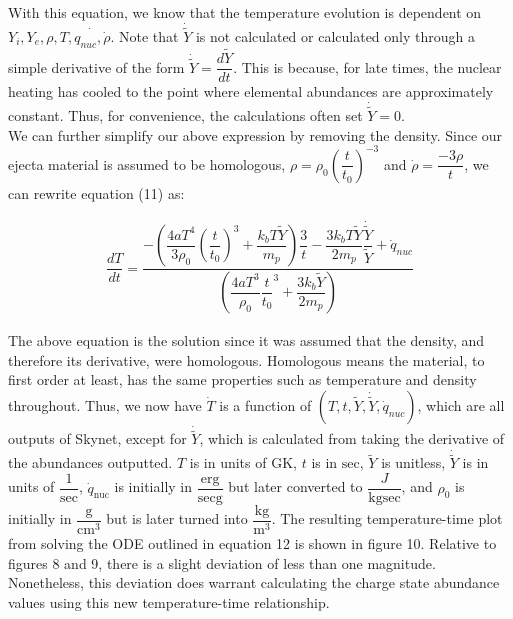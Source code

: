 \documentclass[11pt,a4paper]{article}
\begin{document}
With this equation, we know that the temperature evolution is dependent on $Y_i, Y_e, \rho, T, \dot{q_{nuc}, \dot{\rho}}$. Note that $\dot{\tilde{Y}}$ is not calculated or calculated only through a simple derivative of the form $\dot{\tilde{Y}} = \dfrac{d \tilde{Y}} {dt} $. This is because, for late times, the nuclear heating has cooled to the point where elemental abundances are approximately constant. Thus, for convenience, the calculations often set $\dot{\tilde{Y}} = 0$. \\

We can further simplify our above expression by removing the density. Since our ejecta material is assumed to be homologous,  $\rho = \rho_0 \left(\dfrac{t}{t_0}\right)^{-3}$ and $\dot{\rho} = \dfrac{-3 \rho}{t}$, we can rewrite equation (11) as:

\begin{align}
	\dfrac{dT}{dt} =  \dfrac{ -\left( \dfrac{4aT^4}{3 \rho_0} \left (\dfrac{t}{t_0} \right)^3 + \dfrac{k_b T \tilde{Y}}{m_p} \right) \dfrac{3}{t} - \dfrac{3 k_b T \tilde{Y}}{2 m_p} \dfrac{\dot{\tilde{Y}}}{\tilde{Y}} + \dot{q}_{nuc} } {  \left( \dfrac{4 a T^3}{\rho_0} \dfrac{t}{t_0}^3 + \dfrac{3 k_b \tilde{Y}}{2 m_p}\right) }
\end{align}

The above equation is the solution since it was assumed that the density, and therefore its derivative, were homologous. Homologous means the material, to first order at least, has the same properties such as temperature and density throughout.  Thus, we now have $\dot{T}$ is a function of $(T,t,\tilde{Y}, \dot{\tilde{Y}},\dot{q}_{nuc})$, which are all outputs of Skynet, except for $\dot{\tilde{Y}}$, which is calculated from taking the derivative of the abundances outputted. $T$ is in units of $\mathrm{GK}$, $t$ is in $\mathrm{sec}$, $\tilde{Y}$ is unitless,                $\dot{\tilde{Y}}$ is in units of $\dfrac{1}{\mathrm{sec}}$, $\dot{q}_{\mathrm{nuc}}$ is initially in $\dfrac{\mathrm{erg}}{\mathrm{sec g}}$ but later converted to $\dfrac{J}{\mathrm{kg sec}}$, and $\rho_0$ is initially in $\dfrac{\mathrm{g}}{{\mathrm{cm}}^3}$ but is later turned into $\dfrac{\mathrm{kg}}{\mathrm{m}^3}$. The resulting temperature-time plot from solving the ODE outlined in equation 12 is shown in figure 10. Relative to figures 8 and 9, there is a slight deviation of less than one magnitude. Nonetheless, this deviation does warrant calculating the charge state abundance values using this new temperature-time relationship. \\
\end{document}
